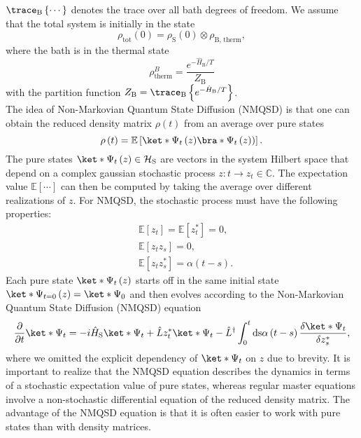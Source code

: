 $\trace_\text{B}\left\{\cdots\right\}$ denotes the trace over all bath degrees of freedom.
We assume that the total system is initially in the state
\begin{equation*}
    \rho_\text{tot}\left(0\right) = \rho_\text{S}\left(0\right) \otimes \rho_\text{B, therm},
\end{equation*}
where the bath is in the thermal state
\begin{equation*}
    \rho_\text{therm}^{B} = \frac{e^{-\hat{H}_\text{B} / T}}{Z_\text{B}}
\end{equation*}
with the partition function $Z_\text{B} = \trace_\text{B}\left\{e^{-\hat{H}_\text{B} / T}\right\}$.
\\
The idea of Non-Markovian Quantum State Diffusion (NMQSD) is that one can obtain the reduced density matrix
$\rho\left(t\right)$ from an average over pure states
\begin{equation}
    \label{eq:averaging_states_linear}
    \rho\left(t\right) = \mathbb{E}\left[\ket*{\Psi_t\left(z\right)}\bra*{\Psi_t\left(z)\right)}\right].
\end{equation}
The pure states $\ket*{\Psi_t\left(z\right)} \in \mathcal{H}_\text{S}$ are vectors in the system
Hilbert space that depend on a complex gaussian stochastic process $z \colon t \rightarrow z_t \in \mathbb{C}$.
The expectation value $\mathbb{E}\left[\cdots\right]$ can then be computed by taking the
average over different realizations of $z$. For NMQSD, the stochastic process must
have the following properties:
\begin{equation}
    \label{eq:stochastic_process_condition}
    \begin{aligned}
        & \mathbb{E}\left[z_{t}\right]=\mathbb{E}\left[z_{t}^*\right]=0,\\
        & \mathbb{E}\left[z_{t}z_{s}\right]=0,\\
        & \mathbb{E}\left[z_{t}z_{s}^*\right]=\alpha\left(t-s\right). 
    \end{aligned}
\end{equation}
Each pure state $\ket*{\Psi_t\left(z\right)}$ starts off in the same initial state
$\ket*{\Psi_{t=0}\left(z\right)}=\ket*{\Psi_0}$ and then evolves according
to the Non-Markovian Quantum State Diffusion (NMQSD) equation \cite{Diosi:1997,Diosi:1998}
\begin{equation}
    \label{eq:non_markovian_schroedinger_equation}
    \frac{\partial}{\partial t} \ket*{\Psi_t} = -i\hat{H}_\text{S} \ket*{\Psi_t}
    + \hat{L} z_{t}^* \ket*{\Psi_t}
    - \hat{L}^\dagger \int_0^t \text{ds} \alpha\left(t-s\right) 
    \frac{\delta \ket*{\Psi_t}}{\delta z_{s}^*},
\end{equation}
where we omitted the explicit dependency of $\ket*{\Psi_t}$ on $z$ due to brevity.
It is important to realize that the NMQSD equation describes the dynamics in terms of a stochastic
expectation value of pure states, whereas regular master equations involve a non-stochastic
differential equation of the reduced density matrix. The advantage of the NMQSD equation is that
it is often easier to work with pure states than with density matrices.